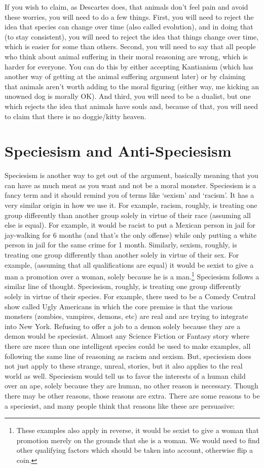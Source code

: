 If you wish to claim, as Descartes does, that animals don't feel pain and avoid these worries, you will need to do a few things. First, you will need to reject the idea that species can change over time (also called evolution), and in doing that (to stay consistent), you will need to reject the idea that things change over time, which is easier for some than others. Second, you will need to say that all people who think about animal suffering in their moral reasoning are wrong, which is harder for everyone. You can do this by either accepting Kantianism (which has another way of getting at the animal suffering argument later) or by claiming that animals aren't worth adding to the moral figuring (either way, me kicking an unowned dog is morally OK). And third, you will need to be a dualist, but one which rejects the idea that animals have souls and, because of that, you will need to claim that there is no doggie/kitty heaven.

\section{Speciesism and Anti-Speciesism}

Speciesism is another way to get out of the argument, basically meaning that you can have as much meat as you want and not be a moral monster. Speciesism is a fancy term and it should remind you of terms like ‘sexism’ and ‘racism’. It has a very similar origin in how we use it. For example, racism, roughly, is treating one group differently than another group solely in virtue of their race (assuming all else is equal). For example, it would be racist to put a Mexican person in jail for jay-walking for 6 months (and that's the only offense) while only putting a white person in jail for the same crime for 1 month. Similarly, sexism, roughly, is treating one group differently than another solely in virtue of their sex. For example, (assuming that all qualifications are equal) it would be sexist to give a man a promotion over a woman, solely because he is a man.\footnote{These examples also apply in reverse, it would be sexist to give a woman that promotion merely on the grounds that she is a woman. We would need to find other qualifying factors which should be taken into account, otherwise flip a coin.} Speciesism follows a similar line of thought. Speciesism, roughly, is treating one group differently solely in virtue of their species. For example, there used to be a Comedy Central show called Ugly Americans in which the core premise is that the various monsters (zombies, vampires, demons, etc) are real and are trying to integrate into New York. Refusing to offer a job to a demon solely because they are a demon would be speciesist. Almost any Science Fiction or Fantasy story where there are more than one intelligent species could be used to make examples, all following the same line of reasoning as racism and sexism. But, speciesism does not just apply to these strange, unreal, stories, but it also applies to the real world as well. Speciesism would tell us to favor the interests of a human child over an ape, solely because they are human, no other reason is necessary. Though there may be other reasons, those reasons are extra. There are some reasons to be a speciesist, and many people think that reasons like these are persuasive: 
